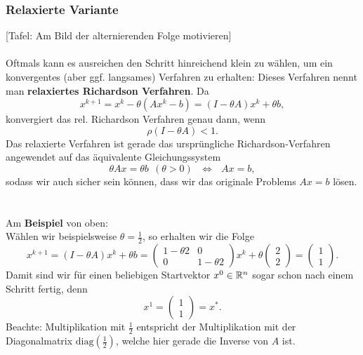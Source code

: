 \subsubsection{Relaxierte Variante}
[Tafel: Am Bild der alternierenden Folge motivieren]\\~\\
Oftmals kann es ausreichen den Schritt hinreichend klein zu wählen, um ein konvergentes (aber ggf. langsames) Verfahren zu erhalten:
Dieses Verfahren nennt man \textbf{relaxiertes Richardson Verfahren}.
Da $$x^{k+1} = x^k - \theta(Ax^k - b) = (I-\theta A)x^k + \theta b,$$ konvergiert das rel. Richardson Verfahren genau dann, wenn $$\rho(I-\theta A) < 1. $$
Das relaxierte Verfahren ist gerade das ursprüngliche Richardson-Verfahren angewendet auf das äquivalente Gleichungssystem 
$$\theta Ax = \theta b~~(\theta > 0 ) ~~~\Leftrightarrow~~~Ax = b,$$
sodass wir auch sicher sein können, dass wir das originale Problems $Ax=b$ lösen.
~\\~\\
Am \textbf{Beispiel} von oben:\\
Wählen wir beispielsweise $\theta = \frac{1}{2}$, so erhalten wir die Folge 
$$x^{k+1} = (I-\theta A)x^k + \theta b = \begin{pmatrix}1-\theta 2&0\\0&1-\theta 2\end{pmatrix}x^k + \theta\begin{pmatrix}2\\2\end{pmatrix} = \begin{pmatrix}1\\1\end{pmatrix}. $$
Damit sind wir für einen beliebigen Startvektor $x^0\in{\mathbb{R}}^{n}$ sogar schon nach einem Schritt fertig, denn
$$x^1 =  \begin{pmatrix}1\\1\end{pmatrix}  = x^*. $$
Beachte: Multiplikation mit $\frac{1}{2}$ entspricht der Multiplikation mit der Diagonalmatrix $\text{diag}(\frac{1}{2})$, welche hier gerade die Inverse von $A$ ist. \\

